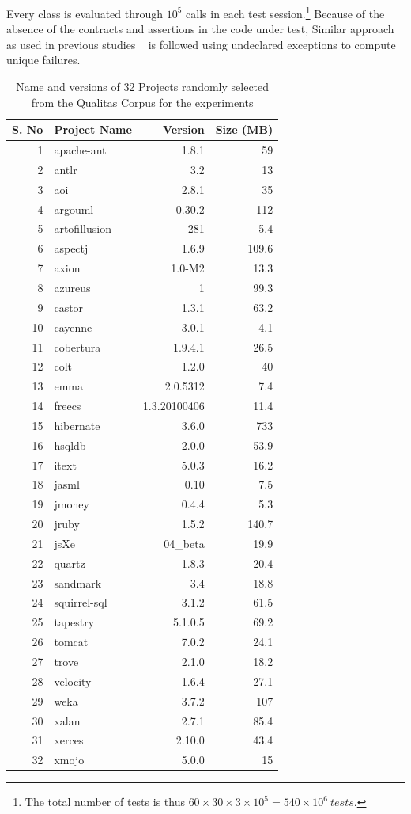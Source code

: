 \documentclass[conference]{IEEEtran}
\begin{document}
Every class is evaluated through $10^5$ calls in each test session.\footnote{The total number of tests is thus $60\times 30\times 3 \times 10^5 = 540\times 10^6~tests$.} 
Because of the absence of the contracts and assertions in the code under test, Similar approach as used in previous studies ~\cite{Oriol2012} is followed using undeclared exceptions to compute unique failures.


\begin{table}[h]
\caption{Name and versions of 32 Projects randomly selected from the Qualitas Corpus for the experiments}
\centering
\begin{tabular}{|r|l|r|r|}
\hline
S. No& 	Project Name	& 	Version		&	Size (MB)\\
\hline
1	&	apache-ant	&	1.8.1			&	59\\
2	&	antlr			&	3.2			&	13\\
3	&	aoi			&	2.8.1			&	35\\
4	&	argouml		&	0.30.2		&	112\\
5	&	artofillusion	&	281			&	5.4\\
6	&	aspectj		&	1.6.9			&	109.6\\
7	&	axion		&	1.0-M2		&	13.3\\
8	&	azureus		&	1			&	99.3\\
9	&	castor		&	1.3.1			&	63.2\\
10	&	cayenne		&	3.0.1			&	4.1\\
11	&	cobertura		&	1.9.4.1		&	26.5\\
12	&	colt			&	1.2.0			&	40\\
13	&	emma		&	2.0.5312		&	7.4\\
14	&	freecs		&	1.3.20100406	&	11.4\\
15	&	hibernate		&	3.6.0			&	733\\
16	&	hsqldb		&	2.0.0			&	53.9\\
17	&	itext			&	5.0.3			&	16.2\\
18	&	jasml		&	0.10			&	7.5 \\
19	&	jmoney		&	0.4.4			&	5.3\\
20	&	jruby			&	1.5.2			&	140.7\\
21	&	jsXe			&	04\_beta		&	19.9\\
22	&	quartz		&	1.8.3			&	20.4\\
23	&	sandmark		&	3.4			&	18.8\\
24	&	squirrel-sql	&	3.1.2			&	61.5\\
25	&	tapestry		&	5.1.0.5		&	69.2\\
26	&	tomcat		&	7.0.2			&	24.1\\
27	&	trove			&	2.1.0			&	18.2\\
28	&	velocity		&	1.6.4			&	27.1\\
29	&	weka		&	3.7.2			&	107\\
30	&	xalan		&	2.7.1			&	85.4\\
31	&	xerces		&	2.10.0		&	43.4\\
32	&	xmojo		&	5.0.0			&	15\\
\hline
\end{tabular}
\bigskip
\label{table:projects}
\end{table}
\end{document}
